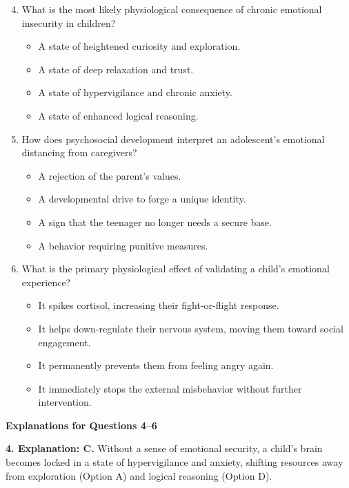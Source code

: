\begin{practiceexercise}
\begin{enumerate}
    \setcounter{enumi}{3}
    \item What is the most likely physiological consequence of chronic emotional insecurity in children?
    \begin{itemize}
        \item[A)] A state of heightened curiosity and exploration.
        \item[B)] A state of deep relaxation and trust.
        \item[C)] A state of hypervigilance and chronic anxiety.
        \item[D)] A state of enhanced logical reasoning.
    \end{itemize}
    \vspace{\fill}
  \item How does psychosocial development interpret an adolescent's emotional distancing from caregivers?
    \begin{itemize}
        \item[A)] A rejection of the parent's values.
        \item[B)] A developmental drive to forge a unique identity.
        \item[C)] A sign that the teenager no longer needs a secure base.
        \item[D)] A behavior requiring punitive measures.
    \end{itemize}
    \vspace{\fill}
  \item What is the primary physiological effect of validating a child's emotional experience?
    \begin{itemize}
        \item[A)] It spikes cortisol, increasing their fight-or-flight response.
        \item[B)] It helps down-regulate their nervous system, moving them toward social engagement.
        \item[C)] It permanently prevents them from feeling angry again.
        \item[D)] It immediately stops the external misbehavior without further intervention.
    \end{itemize}
\end{enumerate}
\vspace{\fill}

\newpage
\textbf{Explanations for Questions 4--6}

\textbf{4. Explanation: C.} Without a sense of emotional security, a child's brain becomes locked in a state of hypervigilance and anxiety, shifting resources away from exploration (Option A) and logical reasoning (Option D).


\end{practiceexercise}
